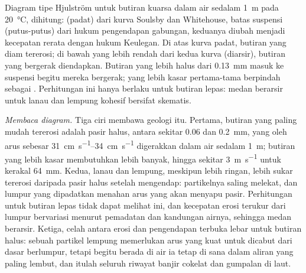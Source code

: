 \begin{omfigure}
{\small Diagram tipe Hjulström untuk butiran kuarsa dalam air sedalam \qty{1}{m} pada \qty{20}{\celsius}, dihitung:  (padat) dari kurva Soulsby dan Whitehouse, batas suspensi (putus-putus) dari hukum pengendapan gabungan, keduanya diubah menjadi kecepatan rerata dengan hukum Keulegan. Di atas kurva padat, butiran yang diam tererosi; di bawah yang lebih rendah dari kedua kurva (diarsir), butiran yang bergerak diendapkan. Butiran yang lebih halus dari \qty{0.13}{mm} masuk ke suspensi begitu mereka bergerak; yang lebih kasar pertama-tama berpindah sebagai . Perhitungan ini hanya berlaku untuk butiran lepas: medan berarsir untuk lanau dan lempung kohesif bersifat skematis.}
\label{fig:b1:erosion-transport:hjulstrom}
\end{omfigure}

\emph{Membaca diagram.} Tiga ciri membawa geologi itu. Pertama, butiran yang paling mudah tererosi adalah pasir halus, antara sekitar \num{0.06} dan \qty{0.2}{mm}, yang oleh arus sebesar \qtyrange{31}{34}{cm.s^{-1}} digerakkan dalam air sedalam \qty{1}{m}; butiran yang lebih kasar membutuhkan lebih banyak, hingga sekitar \qty{3}{m.s^{-1}} untuk kerakal \qty{64}{mm}. Kedua, lanau dan lempung, meskipun lebih ringan, lebih sukar tererosi daripada pasir halus setelah mengendap: partikelnya saling melekat, dan lumpur yang dipadatkan menahan arus yang akan menyapu pasir. Perhitungan untuk butiran lepas tidak dapat melihat ini, dan kecepatan erosi terukur dari lumpur bervariasi menurut pemadatan dan kandungan airnya, sehingga medan berarsir. Ketiga, celah antara erosi dan pengendapan terbuka lebar untuk butiran halus: sebuah partikel lempung memerlukan arus yang kuat untuk dicabut dari dasar berlumpur, tetapi begitu berada di air ia tetap di sana dalam aliran yang paling lembut, dan itulah seluruh riwayat banjir cokelat dan gumpalan di laut.

